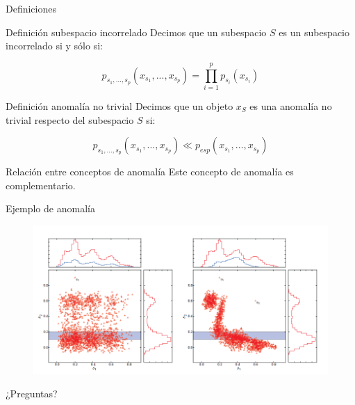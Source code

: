 \documentclass[10pt]{beamer}
\begin{document}
\begin{frame}[fragile]{Definiciones}
\vspace{10px}
\pause
{}

\begin{block}{Definición subespacio incorrelado}
	Decimos que un subespacio $S$ es un subespacio incorrelado si y sólo si:
	
	$$p_{s_1 , ... , s_p}(x_{s_1} , ... , {x_{s_p}}) = \prod_{i=1}^{p}p_{s_i}(x_{s_i})$$
\end{block}

\pause

\begin{block}{Definición anomalía no trivial}
	Decimos que un objeto $x_S$ es una anomalía no trivial respecto del subespacio $S$ si:
	
	$$p_{s_1 , ... , s_p}(x_{s_1} , ... , x_{s_p})\ll p_{esp}(x_{s_1} , ... , x_{s_p})$$
\end{block}

\pause

\begin{alertblock}{Relación entre conceptos de anomalía}
	Este concepto de anomalía es complementario.
\end{alertblock}

\end{frame}

\begin{frame}[fragile]{Ejemplo de anomalía}
\vspace{10px}
\pause
{}

\begin{figure}
	\centering
	\includegraphics[scale=0.5]{Imagenes/ejemplo_anomalia_probabilidad}
\end{figure}

\end{frame}

\begin{frame}[standout]
	\LARGE{¿Preguntas?}
	\vspace{10px}
\end{frame}
\end{document}
